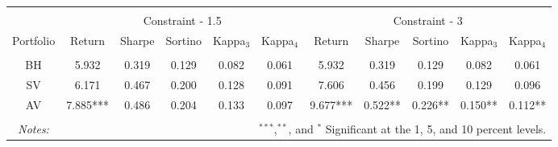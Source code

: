\begin{tabular}{@{\extracolsep{5pt}} ccccccccccc} 
\hline \\[-1.8ex] 
& \multicolumn{5}{c}{Constraint - 1.5} &\multicolumn{5}{c}{Constraint - 3}\\
\cline{2-6} \cline{7-11}
Portfolio & Return & Sharpe & Sortino & Kappa$_{3}$ & Kappa$_{4}$ & Return & Sharpe & Sortino & Kappa$_{3}$ & Kappa$_{4}$ \\ 
\hline \\[-1.8ex] 
BH & 5.932 & 0.319 & 0.129 & 0.082 & 0.061 & 5.932 & 0.319 & 0.129 & 0.082 & 0.061 \\ 
SV & 6.171 & 0.467 & 0.200 & 0.128 & 0.091 & 7.606 & 0.456 & 0.199 & 0.129 & 0.096 \\ 
AV & 7.885*** & 0.486 & 0.204 & 0.133 & 0.097 & 9.677*** & 0.522** & 0.226** & 0.150** & 0.112** \\ 
\hline\\
\textit{Notes:} & \multicolumn{10}{r}{$^{***}$,$^{**}$, and $^{*}$ Significant at the 1, 5, and 10 percent levels.}
\end{tabular}